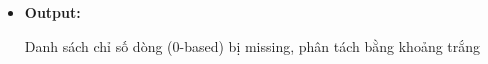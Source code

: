 \begin{itemize}
\begin{itemize}
        \item \textbf{Module 3 (Đọc file \& phát hiện):}
        \begin{itemize}
            \item Hàm \texttt{findMissingLines(path, vector<int>\&)}
            \item Đọc từng dòng bằng \texttt{getline}
            \item Nếu dòng là missing $\rightarrow$ lưu chỉ số dòng (0-based)
        \end{itemize}

        \item \textbf{Module 4 (Ghi output):}
        \begin{itemize}
            \item Hàm \texttt{writeOutput(path, indices)}
            \item In danh sách chỉ số dòng bị missing
        \end{itemize}
    \end{itemize}

    \item \textbf{Output:}
    \begin{center}
    Danh sách chỉ số dòng (0-based) bị missing, phân tách bằng khoảng trắng
    \end{center}
\end{itemize}

